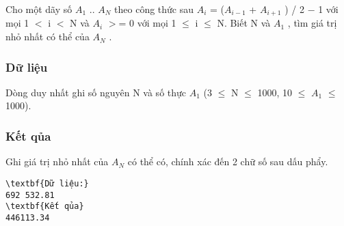 



   Cho một dãy số $A_{1}$   .. $A_{N}$   theo công thức sau $A_{i}$   = ($A_{i−1}$   + $A_{i+1}$   ) / 2 − 1 với mọi 1 $<$ i $<$ N và $A_{i}$   $>$= 0 với mọi 1  $\le$  i  $\le$  N. Biết N và $A_{1}$   , tìm giá trị nhỏ nhất có thể của $A_{N}$   .  

\subsubsection{   Dữ liệu  }

   Dòng duy nhất ghi số nguyên N và số thực $A_{1}$   (3  $\le$  N  $\le$  1000, 10  $\le$  $A_{1}$    $\le$  1000).  

\subsubsection{   Kết qủa  }

   Ghi giá trị nhỏ nhất của $A_{N}$   có thể có, chính xác đến 2 chữ số sau dấu phẩy.  
\begin{verbatim}
\textbf{Dữ liệu:} 
692 532.81
\textbf{Kết qủa} 
446113.34 
\end{verbatim}
